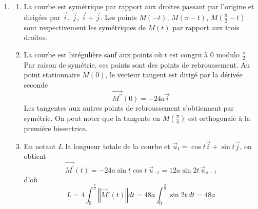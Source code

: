 \begin{enumerate}
 \item 
\begin{enumerate}
 \item La courbe est sym{\'e}trique par rapport aux droites passant par l'origine et dirigées par
$\overrightarrow{i}$, $\overrightarrow{j}$, $\overrightarrow{i}+\overrightarrow{j}$.\newline
Les points $M(-t)$, $M(\pi -t)$, $M(\frac{\pi}{2}-t)$ sont respectivement les sym{\'e}triques de $M(t)$ par rapport
aux trois droites.

\item  La courbe est bir{\'e}guli{\`e}re sauf aux points o{\`u} $t$ est congru {\`a} 0 modulo $\frac{\pi }{2}$.\newline
Par raison de sym{\'e}trie, ces points sont des points de rebroussement.\newline
Au point stationnaire $M(0)$, le vecteur tangent est dirigé par la dérivée seconde
\begin{displaymath}
\overrightarrow{M^{\prime \prime }}(0) = -24a\overrightarrow{i} 
\end{displaymath}
Les tangentes aux autres points de rebroussement s'obtiennent par sym{\'e}trie. On peut noter que la tangente en
$M(\frac{\pi }{4})$ est orthogonale {\`a} la premi{\`e}re bissectrice.

\item  En notant $L$ la longueur totale de la courbe et $\overrightarrow{u}_{t}=\cos t\overrightarrow{i}+\sin t\overrightarrow{j}$, on obtient 
\begin{displaymath}
\overrightarrow{M^{\prime }}(t)=-24a\sin t\cos t~\overrightarrow{u}_{-t}=12a\sin 2t\,\overrightarrow{u}_{\pi -t} 
\end{displaymath}
d'o{\`u}
\begin{displaymath}
L = 4\int_{0}^{\frac{\pi }{2}} 
\left\Vert
\overrightarrow{M}'(t)
\right\Vert dt
= 48a\int_{0}^{\frac{\pi }{2}}\sin 2t\,dt = 48a 
\end{displaymath}
\end{enumerate}


\end{enumerate}
